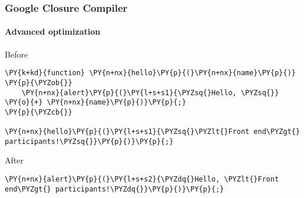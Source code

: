 \begin{frame}[fragile]
  \frametitle{Google Closure Compiler}
  \framesubtitle{Advanced optimization}

  \begin{block}{Before}
\begin{Verbatim}[commandchars=\\\{\}]
\PY{k+kd}{function} \PY{n+nx}{hello}\PY{p}{(}\PY{n+nx}{name}\PY{p}{)} \PY{p}{\PYZob{}}
    \PY{n+nx}{alert}\PY{p}{(}\PY{l+s+s1}{\PYZsq{}Hello, \PYZsq{}} \PY{o}{+} \PY{n+nx}{name}\PY{p}{)}\PY{p}{;}
\PY{p}{\PYZcb{}}

\PY{n+nx}{hello}\PY{p}{(}\PY{l+s+s1}{\PYZsq{}\PYZlt{}Front end\PYZgt{} participants!\PYZsq{}}\PY{p}{)}\PY{p}{;}
\end{Verbatim}
  \end{block}

  \pause

  \begin{block}{After}
\begin{Verbatim}[commandchars=\\\{\}]
\PY{n+nx}{alert}\PY{p}{(}\PY{l+s+s2}{\PYZdq{}Hello, \PYZlt{}Front end\PYZgt{} participants!\PYZdq{}}\PY{p}{)}\PY{p}{;}
\end{Verbatim}

  \end{block}
\end{frame}